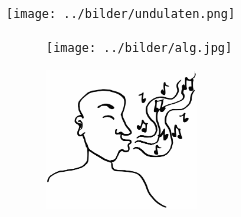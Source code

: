 \sclearpage

\sclearpage

\sclearpage

\begin{intersong}
\begin{center}
\texttt{[image: ../bilder/undulaten.png]} 
\end{center}
\end{intersong}
\sclearpage

\sclearpage

\sclearpage



\begin{figure}
\begin{center}
\texttt{[image: ../bilder/alg.jpg]} 
\end{center}
\end{figure}
\clearpage

\clearpage

\clearpage

\clearpage

\clearpage

\clearpage


%
\clearpage
\begin{figure}[h]
	\begin{center}
		\includegraphics[width=40mm]{../bilder/fardigabilder/BilderTillKapitel/visslaren.png} 
	\end{center}
\end{figure}
